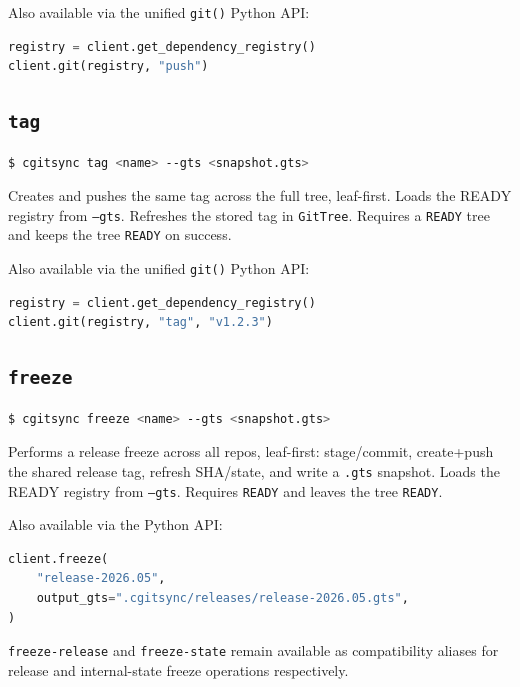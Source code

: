 Also available via the unified \texttt{git()} Python API:

\begin{lstlisting}[language=Python]
registry = client.get_dependency_registry()
client.git(registry, "push")
\end{lstlisting}

\subsection{\texttt{tag}}

\begin{lstlisting}[language=bash]
$ cgitsync tag <name> --gts <snapshot.gts>
\end{lstlisting}

Creates and pushes the same tag across the full tree, leaf-first.  Loads the
READY registry from \texttt{--gts}.  Refreshes the stored tag in
\texttt{GitTree}.  Requires a \texttt{READY} tree and keeps the tree
\texttt{READY} on success.

Also available via the unified \texttt{git()} Python API:

\begin{lstlisting}[language=Python]
registry = client.get_dependency_registry()
client.git(registry, "tag", "v1.2.3")
\end{lstlisting}

\subsection{\texttt{freeze}}

\begin{lstlisting}[language=bash]
$ cgitsync freeze <name> --gts <snapshot.gts>
\end{lstlisting}

Performs a release freeze across all repos, leaf-first: stage/commit,
create+push the shared release tag, refresh SHA/state, and write a
\texttt{.gts} snapshot. Loads the READY registry from \texttt{--gts}.
Requires \texttt{READY} and leaves the tree \texttt{READY}.

Also available via the Python API:

\begin{lstlisting}[language=Python]
client.freeze(
    "release-2026.05",
    output_gts=".cgitsync/releases/release-2026.05.gts",
)
\end{lstlisting}

\texttt{freeze-release} and \texttt{freeze-state} remain available as
compatibility aliases for release and internal-state freeze operations
respectively.

